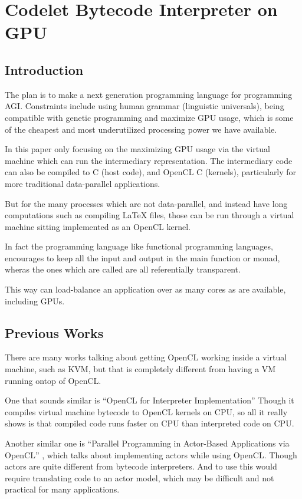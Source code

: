 \chapter{Codelet Bytecode Interpreter on GPU}
\section{Introduction}

The plan is to make a next generation programming language for programming AGI\@.
Constraints include using human grammar (linguistic universals), being
compatible with genetic programming and maximize GPU usage, which is some of the
cheapest and most underutilized processing power we have available.

In this paper only focusing on the maximizing GPU usage via the virtual machine
which can run the intermediary representation.  The intermediary code can also
be compiled to C (host code), and OpenCL C (kernels), particularly for more
traditional data-parallel applications. 

But for the many processes which are not data-parallel, and instead have long
computations such as compiling \LaTeX{} files, those can be run through a virtual
machine sitting implemented as an OpenCL kernel.   

In fact the programming language like functional programming languages,
encourages to keep all the input and output in the main function or monad,
wheras the ones which are called are all referentially transparent.  

This way can load-balance an application over as many cores as are available,
including GPUs. 

\section{Previous Works}

There are many works talking about getting OpenCL working inside a virtual
machine, such as
KVM\cite{SPE:SPE2166}\cite{Gupta:2009:GGV:1519138.1519141}\cite{ratering2011accelerating}, but that is completely different from having a VM running
ontop of OpenCL.\@

One that sounds similar is ``OpenCL for Interpreter Implementation''\cite{OpenCLInterpret}
Though it compiles virtual machine bytecode to OpenCL kernels on CPU, so
all it really shows is that compiled code runs faster on CPU than interpreted code on CPU.\@

Another similar one is ``Parallel Programming in Actor-Based Applications via OpenCL''
\cite{Harvey:2015:PPA:2814576.2814732}, which talks about implementing actors 
while using OpenCL\@. Though actors are quite different from bytecode
interpreters. And to use this would require translating code to an actor model,
which may be difficult and not practical for many applications. 

